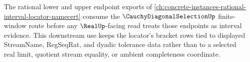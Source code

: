 The rational lower and upper endpoint exports of \autoref{ch:concrete-instances-rational-interval-locator-namecert} consume the $\CauchyDiagonalSelectionUp$ finite-window route before any $\RealUp$-facing read treats those endpoints as interval evidence. This downstream use keeps the locator's bracket rows tied to displayed StreamName, RegSeqRat, and dyadic tolerance data rather than to a selected real limit, quotient stream equality, or ambient completeness coordinate.

